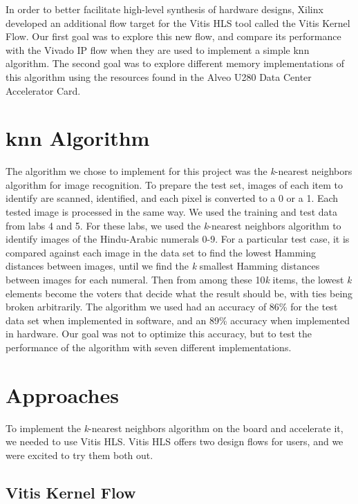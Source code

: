 \documentclass[11pt, final, conference, letterpaper, twocolumn]{IEEEtran}[2015/08/26]
\begin{document}
In order to better facilitate high-level synthesis of hardware designs, Xilinx developed an additional flow target for the Vitis HLS tool called the Vitis Kernel Flow.
Our first goal was to explore this new flow, and compare its performance with the Vivado IP flow when they are used to implement a simple knn algorithm.
The second goal was to explore different memory implementations of this algorithm using the resources found in the Alveo U280 Data Center Accelerator Card.

\section{knn Algorithm}
\label{sec:knn-algorithm}

The algorithm we chose to implement for this project was the \textit{k}-nearest neighbors algorithm for image recognition. To prepare the test set, images of each item to identify are scanned, identified, and each pixel is converted to a 0 or a 1. Each tested image is processed in the same way. We used the training and test data from labs 4 and 5. For these labs, we used the \textit{k}-nearest neighbors algorithm to identify images of the Hindu-Arabic numerals 0-9. For a particular test case, it is compared against each image in the data set to find the lowest Hamming distances between images, until we find the \textit{k} smallest Hamming distances between images for each numeral. Then from among these 10\textit{k} items, the lowest \textit{k} elements become the voters that decide what the result should be, with ties being broken arbitrarily. The algorithm we used had an accuracy of 86\% for the test data set when implemented in software, and an 89\% accuracy when implemented in hardware. Our goal was not to optimize this accuracy, but to test the performance of the algorithm with seven different implementations.

\section{Approaches}
\label{sec:approaches}

To implement the \textit{k}-nearest neighbors algorithm on the board and accelerate it, we needed to use Vitis HLS. Vitis HLS offers two design flows for users, and we were excited to try them both out.

\subsection{Vitis Kernel Flow}
\end{document}
